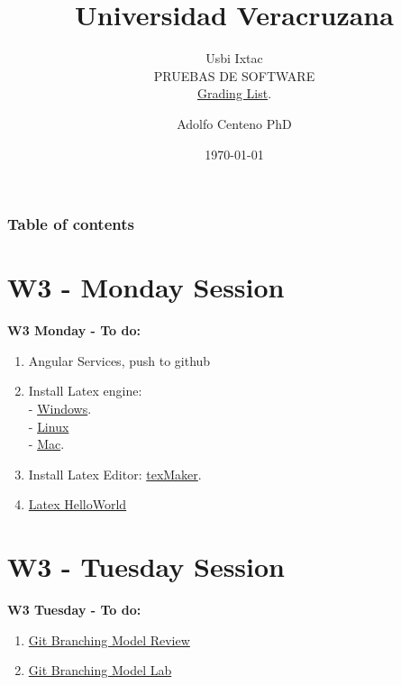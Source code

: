 \documentclass{beamer}
\begin{document}
\title{Universidad Veracruzana}  
\subtitle{Usbi Ixtac\\PRUEBAS DE SOFTWARE\\\href{https://drive.google.com/file/d/1x-8DA-Xe7fQfKMPQY9XWx86y6o0Z-NRR/view?usp=sharing}{Grading List}.
}
\author{Adolfo Centeno PhD}
\date{\today} 


\begin{frame}
\titlepage
\end{frame}

\begin{frame}\frametitle{Table of contents}
\tableofcontents
\end{frame} 


\section{W3 - Monday Session  }

\begin{frame}

\textbf{W3 Monday - To do:}

\begin{enumerate}
\item
	Angular Services, push to github 
\item
    Install Latex engine:  \\
    - \href{https://miktex.org/download}{Windows}. \\
    - \href{https://dzone.com/articles/installing-latex-ubuntu}{Linux} \\
    - \href{http://www.tug.org/mactex/mactex-download.html}{Mac}. 
\item
	Install Latex Editor: \href{https://www.xm1math.net/texmaker/download.html}{texMaker}.	
\item
	\href{https://github.com/adsoftsito/tdd/blob/master/w3/helloworld.tex}{Latex HelloWorld} 

	

\end{enumerate} 

\end{frame}


\section{W3 - Tuesday Session }

\begin{frame}

\textbf{W3 Tuesday - To do:}

\begin{enumerate}
\item
	\href{https://github.com/adsoftsito/tdd/blob/master/w3/gitbranchingmodel.pdf}{Git Branching Model Review} 

\item
	\href{https://github.com/adsoftsito/tdd/blob/master/w3/gitbranchinglab.pdf}{Git Branching Model Lab} 

\end{enumerate} 

\end{frame}
\end{document}
